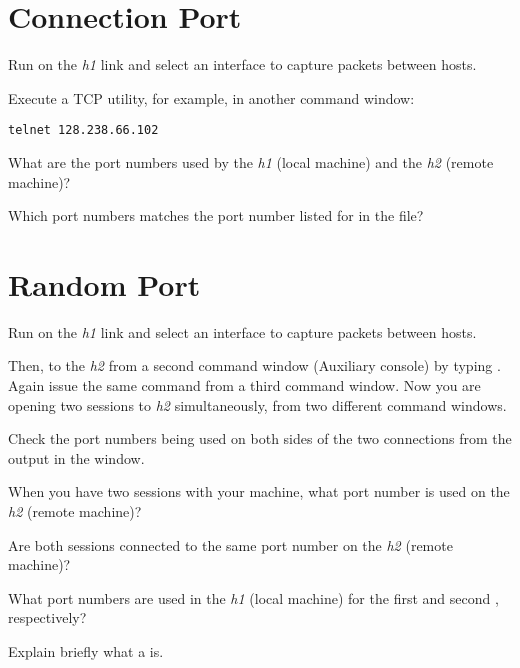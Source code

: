 \documentclass{../UTNetLab}
\begin{document}
\section{Connection Port}
Run  on the \textit{h1} link and select an interface to capture packets between hosts.

Execute a TCP utility,  for example, in another command window:
\begin{lstlisting}
telnet 128.238.66.102
    \end{lstlisting}

\begin{report}
    \item What are the port numbers used by the \textit{h1} (local machine) and the \textit{h2} (remote machine)?

    \item Which port numbers matches the port number listed for  in the  file?
\end{report}

\section{Random Port}
Run  on the \textit{h1} link and select an interface to capture packets between hosts.

Then,  to the \textit{h2} from a second command window (Auxiliary console) by typing .
Again issue the same  command from a third command window.
Now you are opening two  sessions to \textit{h2} simultaneously, from two different command windows.

Check the port numbers being used on both sides of the two connections from the output in the  window.

\begin{report}
    \item When you have two  sessions with your machine, what port number is used on the \textit{h2} (remote machine)?

    \item Are both sessions connected to the same port number on the \textit{h2} (remote machine)?

    \item What port numbers are used in the \textit{h1} (local machine) for the first and second , respectively?

    \item Explain briefly what a  is.
\end{report}
\end{document}
